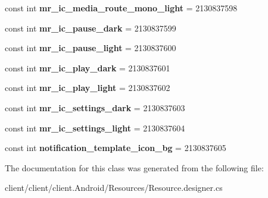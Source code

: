 \begin{DoxyCompactItemize}
\item 
\hypertarget{classClient_1_1Droid_1_1Resource_1_1Drawable_a654baa6bebcd37076c8323b2859e9d0b}{}const int {\bfseries mr\+\_\+ic\+\_\+media\+\_\+route\+\_\+mono\+\_\+light} = 2130837598\label{classClient_1_1Droid_1_1Resource_1_1Drawable_a654baa6bebcd37076c8323b2859e9d0b}

\item 
\hypertarget{classClient_1_1Droid_1_1Resource_1_1Drawable_a573b4d8c0cb6d961a83f6bbb4a915177}{}const int {\bfseries mr\+\_\+ic\+\_\+pause\+\_\+dark} = 2130837599\label{classClient_1_1Droid_1_1Resource_1_1Drawable_a573b4d8c0cb6d961a83f6bbb4a915177}

\item 
\hypertarget{classClient_1_1Droid_1_1Resource_1_1Drawable_a16c24b72d06255e869ecf4afab4748c8}{}const int {\bfseries mr\+\_\+ic\+\_\+pause\+\_\+light} = 2130837600\label{classClient_1_1Droid_1_1Resource_1_1Drawable_a16c24b72d06255e869ecf4afab4748c8}

\item 
\hypertarget{classClient_1_1Droid_1_1Resource_1_1Drawable_af7d814f229bea79ec5fe4752f9cf0721}{}const int {\bfseries mr\+\_\+ic\+\_\+play\+\_\+dark} = 2130837601\label{classClient_1_1Droid_1_1Resource_1_1Drawable_af7d814f229bea79ec5fe4752f9cf0721}

\item 
\hypertarget{classClient_1_1Droid_1_1Resource_1_1Drawable_a9435e562de90479466af0b9bc993f9d9}{}const int {\bfseries mr\+\_\+ic\+\_\+play\+\_\+light} = 2130837602\label{classClient_1_1Droid_1_1Resource_1_1Drawable_a9435e562de90479466af0b9bc993f9d9}

\item 
\hypertarget{classClient_1_1Droid_1_1Resource_1_1Drawable_a1b36b0c363ed4f3acb36de93863c9ef5}{}const int {\bfseries mr\+\_\+ic\+\_\+settings\+\_\+dark} = 2130837603\label{classClient_1_1Droid_1_1Resource_1_1Drawable_a1b36b0c363ed4f3acb36de93863c9ef5}

\item 
\hypertarget{classClient_1_1Droid_1_1Resource_1_1Drawable_abdc0148543fd69f798dda6e6776768d1}{}const int {\bfseries mr\+\_\+ic\+\_\+settings\+\_\+light} = 2130837604\label{classClient_1_1Droid_1_1Resource_1_1Drawable_abdc0148543fd69f798dda6e6776768d1}

\item 
\hypertarget{classClient_1_1Droid_1_1Resource_1_1Drawable_a8673267d5a35e65f27fb6ac0d4116961}{}const int {\bfseries notification\+\_\+template\+\_\+icon\+\_\+bg} = 2130837605\label{classClient_1_1Droid_1_1Resource_1_1Drawable_a8673267d5a35e65f27fb6ac0d4116961}

\end{DoxyCompactItemize}


The documentation for this class was generated from the following file\+:\begin{DoxyCompactItemize}
\item 
client/client/client.\+Android/\+Resources/Resource.\+designer.\+cs\end{DoxyCompactItemize}
